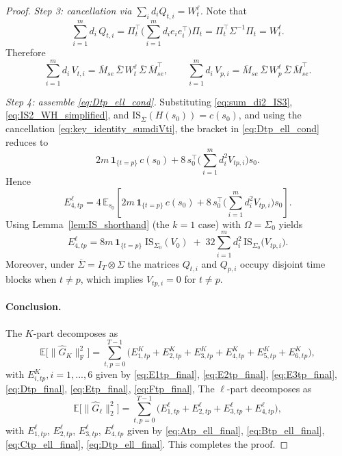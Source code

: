 \begin{proof}
\emph{Step 3: cancellation via $\sum_i d_i Q_{t,i}=W^\ell_t$.}
Note that
\[
\sum_{i=1}^m d_i\,Q_{t,i}
=\Pi_t^\top\Big(\sum_{i=1}^m d_i e_ie_i^\top\Big)\Pi_t
=\Pi_t^\top \Sigma^{-1} \Pi_t
=W^\ell_t.
\]
Therefore
\begin{equation}\label{eq:key_identity_sumdiVti}
\sum_{i=1}^m d_i\,V_{t,i}
=\overline M_{se}\,\overline\Sigma\,W^\ell_t\,\overline\Sigma\,\overline M_{se}^\top,
\qquad
\sum_{i=1}^m d_i\,V_{p,i}
=\overline M_{se}\,\overline\Sigma\,W^\ell_p\,\overline\Sigma\,\overline M_{se}^\top.
\end{equation}

\emph{Step 4: assemble \eqref{eq:Dtp_ell_cond}.}
Substituting \eqref{eq:sum_di2_IS3}, \eqref{eq:IS2_WH_simplified}, and $\mathrm{IS}_{\overline\Sigma}(H(s_0))=c(s_0)$,
and using the cancellation \eqref{eq:key_identity_sumdiVti}, the bracket in \eqref{eq:Dtp_ell_cond} reduces to
\[
2m\,\mathbf 1_{\{t=p\}}\,c(s_0)+8\,s_0^\top\Big(\sum_{i=1}^m d_i^2 V_{tp,i}\Big)s_0.
\]
Hence
\[
E^{\ell}_{4,tp}
=4\,\mathbb E_{s_0} \left[2m\,\mathbf 1_{\{t=p\}}\,c(s_0)+8\,s_0^\top\Big(\sum_{i=1}^m d_i^2 V_{tp,i}\Big)s_0\right].
\]
Using Lemma~\ref{lem:IS_shorthand} (the $k=1$ case) with $\Omega=\Sigma_0$ yields
\begin{equation}\label{eq:Dtp_ell_final}
E^{\ell}_{4,tp}
=
8m\,\mathbf 1_{\{t=p\}}\;\mathrm{IS}_{\Sigma_0}(V_0)
\;+\;
32\sum_{i=1}^m d_i^2\,\mathrm{IS}_{\Sigma_0} \big(V_{tp,i}\big).
\end{equation}
Moreover, under $\overline\Sigma=I_T\otimes\Sigma$ the matrices $Q_{t,i}$ and $Q_{p,i}$ occupy disjoint time blocks when
$t\neq p$, which implies $V_{tp,i}=0$ for $t\neq p$.

\paragraph{Conclusion.}
The $K$-part decomposes as
\[
\mathbb E\big[\|\widehat G_K\|_{\mathrm{F}}^2\big]
=\sum_{t,p=0}^{T-1}\big(E^{K}_{1,tp}+E^{K}_{2,tp}+E^{K}_{3,tp}+E^{K}_{4,tp}+E^{K}_{5,tp}+E^{K}_{6,tp}\big),
\]
with  $E^{K}_{i,tp}, i = 1,...,6$ given by \eqref{eq:E1tp_final}, \eqref{eq:E2tp_final}, \eqref{eq:E3tp_final}, \eqref{eq:Dtp_final}, \eqref{eq:Etp_final}, \eqref{eq:Ftp_final},
The $\ell$-part decomposes as
\[
\mathbb E\big[\|\widehat G_{\ell}\|_2^2\big]
=\sum_{t,p=0}^{T-1}\big(E^{\ell}_{1,tp}+E^{\ell}_{2,tp}+E^{\ell}_{3,tp}+E^{\ell}_{4,tp}\big),
\]
with $E^{\ell}_{1,tp}$, $E^{\ell}_{2,tp}$, $E^{\ell}_{3,tp}$, $E^{\ell}_{4,tp}$ given by
\eqref{eq:Atp_ell_final}, \eqref{eq:Btp_ell_final}, \eqref{eq:Ctp_ell_final}, \eqref{eq:Dtp_ell_final}.
This completes the proof.
\end{proof}


